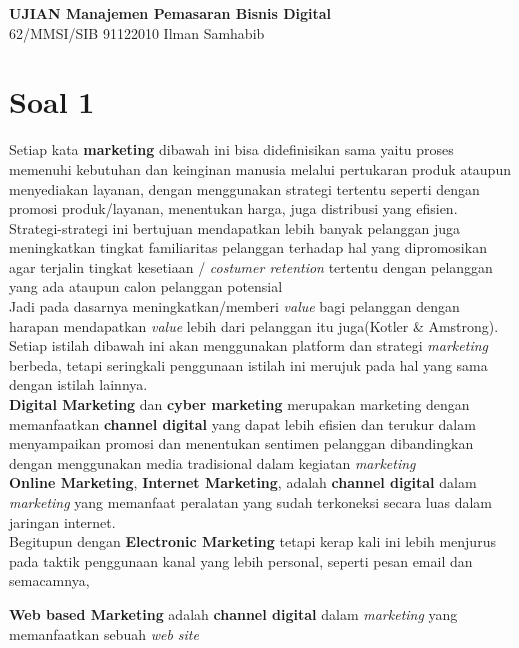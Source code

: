 \documentclass{article}
\begin{document}
\begin{center}
    \textbf{UJIAN Manajemen Pemasaran Bisnis Digital}\\
    62/MMSI/SIB 91122010 Ilman Samhabib
\end{center}
\section*{Soal 1}
Setiap kata \textbf{marketing} 
dibawah ini bisa didefinisikan sama yaitu proses 
memenuhi kebutuhan 
dan keinginan manusia melalui pertukaran 
produk ataupun menyediakan layanan, 
dengan menggunakan strategi tertentu 
seperti dengan promosi produk/layanan, 
menentukan harga, 
juga distribusi yang efisien. 
Strategi-strategi ini bertujuan mendapatkan 
lebih banyak pelanggan 
juga meningkatkan tingkat familiaritas pelanggan terhadap 
hal yang dipromosikan
agar terjalin tingkat kesetiaan  
/ \emph{costumer retention} tertentu dengan pelanggan yang ada 
ataupun 
calon pelanggan potensial\\
Jadi pada dasarnya meningkatkan/memberi 
\emph{value} bagi pelanggan dengan harapan 
mendapatkan \emph{value} lebih 
dari pelanggan itu juga(Kotler \& Amstrong).
\\

\noindent Setiap istilah dibawah ini akan menggunakan 
platform dan strategi 
\emph{marketing} berbeda, 
tetapi seringkali penggunaan istilah ini merujuk pada 
hal yang sama dengan istilah lainnya.\\

\noindent\textbf{Digital Marketing} dan \textbf{cyber marketing} merupakan 
marketing dengan memanfaatkan 
\textbf{channel digital} yang dapat lebih efisien dan terukur
dalam menyampaikan promosi 
dan menentukan sentimen pelanggan dibandingkan dengan 
menggunakan media tradisional dalam kegiatan \emph{marketing}\\

\noindent\textbf{Online Marketing}, 
\textbf{Internet Marketing}, 
adalah \textbf{channel digital} 
dalam \emph{marketing} yang memanfaat peralatan yang sudah 
terkoneksi secara luas dalam jaringan internet.\\

\noindent Begitupun dengan \textbf{Electronic Marketing} tetapi kerap kali ini lebih menjurus 
pada taktik penggunaan kanal yang lebih personal, 
seperti pesan email dan semacamnya,

\noindent\textbf{Web based Marketing} adalah \textbf{channel digital} 
dalam \emph{marketing} yang memanfaatkan sebuah \emph{web site}\\
\end{document}
